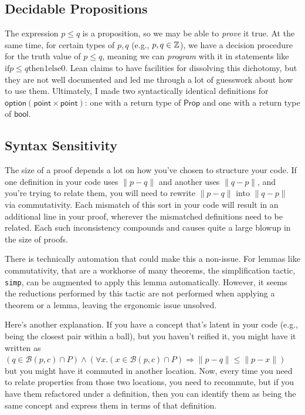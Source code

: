 \documentclass{article}
\begin{document}
\subsection{Decidable Propositions}
The expression $p \leq q$ is a proposition, so we may be able to \textit{prove} it true.
At the same time, for certain types of $p, q$ (e.g., $p, q \in \mathbb{Z}$), we have a decision procedure for the truth value of $p \leq q$, meaning we can \textit{program} with it in statements like $\text{if} p \leq q \text{then} 1 \text{else} 0$.
Lean claims to have facilities for dissolving this dichotomy, but they are not well documented and led me through a lot of guesswork about how to use them.
Ultimately, I made two syntactically identical definitions for $\mathsf{option} (\mathsf{point} \times \mathsf{point})$: one with a return type of $\mathsf{Prop}$ and one with a return type of $\mathsf{bool}$.

\subsection{Syntax Sensitivity}
The size of a proof depends a lot on how you've chosen to structure your code.
If one definition in your code uses $\| p - q \|$ and another uses $\| q - p \|$, and you're trying to relate them, you will need to rewrite $\| p - q \|$ into $\| q - p \|$ via commutativity.
Each mismatch of this sort in your code will result in an additional line in your proof, wherever the mismatched definitions need to be related.
Each such inconsistency compounds and causes quite a large blowup in the size of proofs.

There is technically automation that could make this a non-issue.
For lemmas like commutativity, that are a workhorse of many theorems, the simplification tactic, \texttt{simp}, can be augmented to apply this lemma automatically.
However, it seems the reductions performed by this tactic are not performed when applying a theorem or a lemma, leaving the ergonomic issue unsolved.

Here's another explanation.
If you have a concept that's latent in your code (e.g., being the closest pair within a ball), but you haven't reified it, you might have it written as $(q \in \mathcal{B}(p, c) \cap P) \wedge (\forall x. (x \in \mathcal{B}(p, c) \cap P) \Rightarrow \| p - q \| \leq \| p - x \|)$ but you might have it commuted in another location.
Now, every time you need to relate properties from those two locations, you need to recommute, but if you have them refactored under a definition, then you can identify them as being the same concept and express them in terms of that definition.
\end{document}
